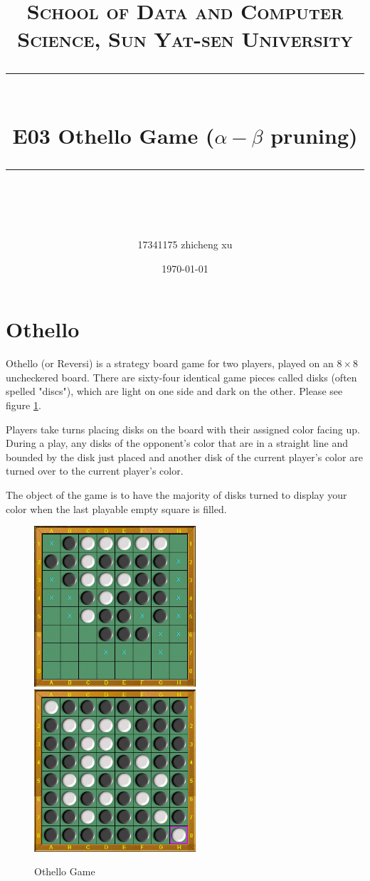 ﻿\documentclass[a4paper, 11pt]{article}
\title{	
\normalfont \normalsize
\textsc{School of Data and Computer Science, Sun Yat-sen University} \\ [25pt] %
\rule{\textwidth}{0.5pt} \\[0.4cm] %
\huge  E03 Othello Game ($\alpha-\beta$ pruning) \\ %
\rule{\textwidth}{2pt} \\[0.5cm] %
\author{17341175 zhicheng xu}
\date{\normalsize\today}
}
\begin{document}
\maketitle
\tableofcontents
\newpage

\section{Othello}
Othello (or Reversi) is a strategy board game for two players, played on an $8 \times 8$ uncheckered board. There are sixty-four identical game pieces called disks (often spelled "discs"), which are light on one side and dark on the other. Please see figure \ref{fig:othello}.

Players take turns placing disks on the board with their assigned color facing up. During a play, any disks of the opponent's color that are in a straight line and bounded by the disk just placed and another disk of the current player's color are turned over to the current player's color.

The object of the game is to have the majority of disks turned to display your color when the last playable empty square is filled.
\begin{figure}
  \centering
  \includegraphics[width=6cm]{Pic/othello}
  \qquad
  \includegraphics[width=6cm]{Pic/othello2}
  \caption{Othello Game}
  \label{fig:othello}
\end{figure}
\end{document}
